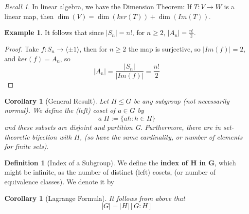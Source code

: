 \documentclass[12pt]{article}
\newtheorem{cor}[thm]{Corollary}
\theoremstyle{definition}
\newtheorem{defn}[thm]{Definition}
\newtheorem{eg}[thm]{Example}
\theoremstyle{remark}
\newtheorem*{rec}{Recall}
\numberwithin{equation}{section}
\newcommand\B[1]{\textbf{ #1}}
\begin{document}
\vspace{15pt}

\begin{rec}
        In linear algebra, we have the Dimension Theorem: If $T: V \rightarrow W$ is a linear map, then $\dim(V) = \dim(ker(T)) + \dim(Im(T))$.
\end{rec}

\vspace{15pt}

\begin{eg}
        It follows that since $|S_n| = n!$, for $n \geq 2$, $|A_n| = \frac{n!}{2}$.
\end{eg}
\begin{proof}
        Take $f:S_n \rightarrow \langle \pm1 \rangle$, then for $n\geq 2$ the map is surjective, so $|Im(f)| = 2$, and $ker(f) = A_n$, so \begin{equation*}
                |A_n| = \frac{|S_n|}{|Im(f)|} = \frac{n!}{2}
        \end{equation*}
\end{proof}

\vspace{15pt}

\begin{cor}[General Result]
        Let $H \leq G$ be any subgroup (not necessarily normal). We define the (left) coset of $a \in G$ by \begin{equation}
                a\;H := \{ah : h \in H\}
        \end{equation}
        and these subsets are disjoint and partition G. Furthermore, there are in set-theoretic bijection with $H$, (so have the same cardinality, or number of elements for finite sets).
\end{cor}

\vspace{15pt}


\begin{defn}[Index of a Subgroup]
        We define the \B{index of H in G}, which might be infinite, as the number of distinct (left) cosets, (or number of equivalence classes). We denote it by \begin{equation}
                [G:H]
        \end{equation}
\end{defn}

\begin{cor}[Lagrange Formula]
        It follows from above that \begin{equation}
                |G| = |H|[G:H]
        \end{equation}
\end{cor}
\end{document}
